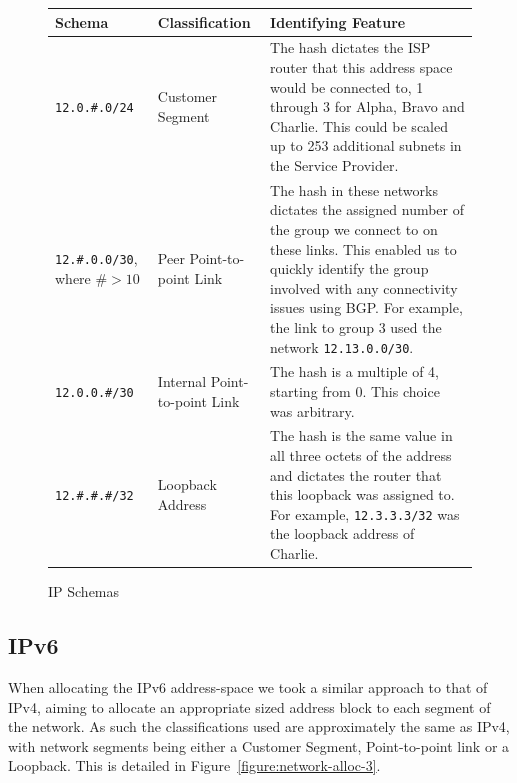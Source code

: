 \begin{figure}[!ht]
    \caption{IP Schemas}
    \label{figure:network-alloc-2}
    \centering
    \begin{tabular}{|p{3cm}|p{3cm}|p{5cm}|}

        \hline
        \textbf{Schema} & \textbf{Classification} & \textbf{Identifying Feature} \\

        \hline
        \texttt{12.0.\#.0/24} & Customer Segment & The hash dictates the ISP
        router that this address space would be connected to, 1 through 3 for
        Alpha, Bravo and Charlie. This could be scaled up to 253 additional
        subnets in the Service Provider.\\
        \hline
        \texttt{12.\#.0.0/30}, where $\#> 10$ & Peer Point-to-point Link &
        The hash in these networks dictates the assigned number of the group we
        connect to on these links. This enabled us to quickly identify the
        group involved with any connectivity issues using BGP. For example, the
        link to group 3 used the network \texttt{12.13.0.0/30}.\\
        \hline
        \texttt{12.0.0.\#/30} & Internal Point-to-point Link &
        The hash is a multiple of 4, starting from 0. This choice was
        arbitrary.\\
        \hline
        \texttt{12.\#.\#.\#/32} & Loopback Address & The hash is
        the same value in all three octets of the address and dictates the
        router that this loopback was assigned to. For example,
        \texttt{12.3.3.3/32} was the loopback address of Charlie.\\

        \hline
    \end{tabular}
\end{figure}

\clearpage

\subsection{IPv6}
When allocating the IPv6 address-space we took a similar approach to that of
IPv4, aiming to allocate an appropriate sized address block to each segment of
the network. As such the classifications used are approximately the same as
IPv4, with network segments being either a Customer Segment, Point-to-point
link or a Loopback. This is detailed in Figure~\ref{figure:network-alloc-3}.

